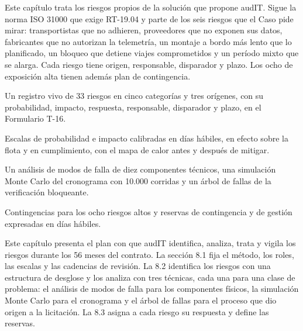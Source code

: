 %

\begin{resumenApertura}
Este capítulo trata los riesgos propios de la solución que propone audIT. Sigue la norma ISO 31000 que exige RT-19.04 y parte de los seis riesgos que el Caso pide mirar:
transportistas que no adhieren, proveedores que no exponen sus datos, fabricantes que no autorizan la
telemetría, un montaje a bordo más lento que lo planificado, un bloqueo que detiene viajes comprometidos
y un período mixto que se alarga. Cada riesgo tiene origen, responsable, disparador y plazo. Los ocho de
exposición alta tienen además plan de contingencia.
\begin{recibe}
  \item Un registro vivo de 33 riesgos en cinco categorías y tres orígenes, con su probabilidad, impacto, respuesta, responsable, disparador y plazo, en el Formulario T-16.
  \item Escalas de probabilidad e impacto calibradas en días hábiles, en efecto sobre la flota y en cumplimiento, con el mapa de calor antes y después de mitigar.
  \item Un análisis de modos de falla de diez componentes técnicos, una simulación Monte Carlo del cronograma con 10.000 corridas y un árbol de fallas de la verificación bloqueante.
  \item Contingencias para los ocho riesgos altos y reservas de contingencia y de gestión expresadas en días hábiles.
\end{recibe}
\end{resumenApertura}

Este capítulo presenta el plan con que audIT identifica, analiza, trata y vigila los riesgos durante los
56 meses del contrato. La sección 8.1 fija el método, los roles, las escalas y las cadencias de revisión.
La 8.2 identifica los riesgos con una estructura de desglose y los analiza con tres técnicas, cada una
para una clase de problema: el análisis de modos de falla para los componentes físicos, la simulación
Monte Carlo para el cronograma y el árbol de fallas para el proceso que dio origen a la licitación. La
8.3 asigna a cada riesgo su respuesta y define las reservas.

